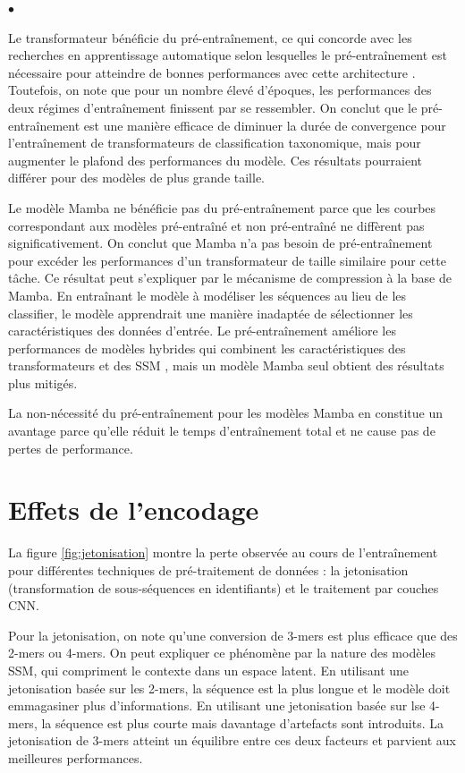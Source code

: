 \begin{list}{$\bullet$}{}
    \item Le transformateur bénéficie du pré-entraînement, ce qui concorde avec les recherches en
        apprentissage automatique selon lesquelles le pré-entraînement est nécessaire pour atteindre
        de bonnes performances avec cette architecture \cite{clark2019}. Toutefois, on note que pour
        un nombre élevé d'époques, les performances des deux régimes d'entraînement finissent par se
        ressembler. On conclut que le pré-entraînement est une manière efficace de diminuer la durée
        de convergence pour l'entraînement de transformateurs de classification taxonomique, mais
        pour augmenter le plafond des performances du modèle. Ces résultats pourraient différer pour
        des modèles de plus grande taille.
    \item Le modèle Mamba ne bénéficie pas du pré-entraînement parce que les courbes correspondant
        aux modèles pré-entraîné et non pré-entraîné ne diffèrent pas significativement. On conclut
        que Mamba n'a pas besoin de pré-entraînement pour excéder les performances d'un
        transformateur de taille similaire pour cette tâche. Ce résultat peut s'expliquer par le
        mécanisme de compression à la base de Mamba. En entraînant le modèle à modéliser les
        séquences au lieu de les classifier, le modèle apprendrait une manière inadaptée de
        sélectionner les caractéristiques des données d'entrée. Le pré-entraînement améliore les
        performances de modèles hybrides qui combinent les caractéristiques des transformateurs et
        des SSM \cite{ren2025}, mais un modèle Mamba seul obtient des résultats plus mitigés.
\end{list}

La non-nécessité du pré-entraînement pour les modèles Mamba en constitue un avantage parce qu'elle
réduit le temps d'entraînement total et ne cause pas de pertes de performance.

\section{Effets de l'encodage}
La figure \ref{fig:jetonisation} montre la perte observée au cours de l'entraînement pour
différentes techniques de pré-traitement de données : la jetonisation (transformation de
sous-séquences en identifiants) et le traitement par couches CNN.

Pour la jetonisation, on note qu'une conversion de 3-mers est plus efficace que des 2-mers ou
4-mers. On peut expliquer ce phénomène par la nature des modèles SSM, qui compriment le contexte
dans un espace latent. En utilisant une jetonisation basée sur les 2-mers, la séquence est la plus
longue et le modèle doit emmagasiner plus d'informations. En utilisant une jetonisation basée sur
lse 4-mers, la séquence est plus courte mais davantage d'artefacts sont introduits. La jetonisation
de 3-mers atteint un équilibre entre ces deux facteurs et parvient aux meilleures performances.

